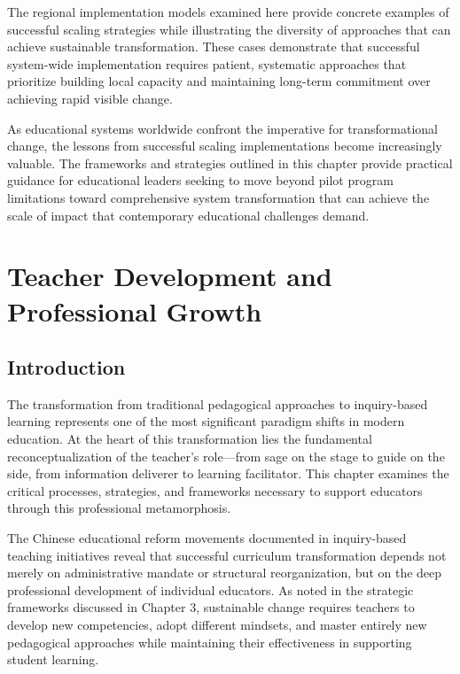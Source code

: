 \documentclass[
  Letterpaper,
]{scrbook}
\begin{document}
The regional implementation models examined here provide concrete
examples of successful scaling strategies while illustrating the
diversity of approaches that can achieve sustainable transformation.
These cases demonstrate that successful system-wide implementation
requires patient, systematic approaches that prioritize building local
capacity and maintaining long-term commitment over achieving rapid
visible change.

As educational systems worldwide confront the imperative for
transformational change, the lessons from successful scaling
implementations become increasingly valuable. The frameworks and
strategies outlined in this chapter provide practical guidance for
educational leaders seeking to move beyond pilot program limitations
toward comprehensive system transformation that can achieve the scale of
impact that contemporary educational challenges demand.


\chapter{Teacher Development and Professional
Growth}\label{teacher-development-and-professional-growth}

\section{Introduction}\label{introduction-5}

The transformation from traditional pedagogical approaches to
inquiry-based learning represents one of the most significant paradigm
shifts in modern education. At the heart of this transformation lies the
fundamental reconceptualization of the teacher's role---from sage on the
stage to guide on the side, from information deliverer to learning
facilitator. This chapter examines the critical processes, strategies,
and frameworks necessary to support educators through this professional
metamorphosis.

The Chinese educational reform movements documented in inquiry-based
teaching initiatives reveal that successful curriculum transformation
depends not merely on administrative mandate or structural
reorganization, but on the deep professional development of individual
educators. As noted in the strategic frameworks discussed in Chapter 3,
sustainable change requires teachers to develop new competencies, adopt
different mindsets, and master entirely new pedagogical approaches while
maintaining their effectiveness in supporting student learning.
\end{document}
